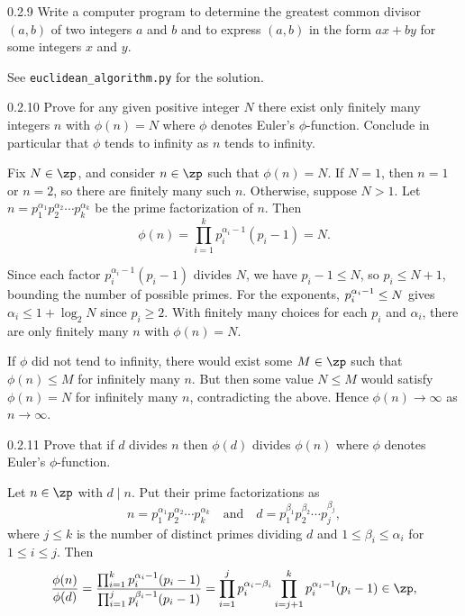 \begin{exercise}{0.2.9}
    Write a computer program to determine the greatest common divisor $(a, b)$ of two integers $a$ and $b$ and to express $(a, b)$ in the form $ax + by$ for some integers $x$ and $y$.
\end{exercise}

\begin{sol}
    See \verb|euclidean_algorithm.py| for the solution.
\end{sol}

\begin{exercise}{0.2.10}
    Prove for any given positive integer $N$ there exist only finitely many integers $n$ with $\phi(n) = N$ where $\phi$ denotes Euler's $\phi$-function.
	Conclude in particular that $\phi$ tends to infinity as $n$ tends to infinity.
\end{exercise}

\begin{sol}
    Fix $N \in \zp$, and consider $n \in \zp$ such that $\phi(n) = N$.
    If $N = 1$, then $n = 1$ or $n = 2$, so there are finitely many such $n$.
    Otherwise, suppose $N > 1$.
	Let $n = p_1^{\alpha_1} p_2^{\alpha_2} \cdots p_k^{\alpha_k}$ be the prime factorization of $n$.
	Then
    \[
    	\phi(n) = \prod_{i=1}^k p_i^{\alpha_i - 1}(p_i - 1) = N.
    \]
    
    Since each factor $p_i^{\alpha_i - 1}(p_i - 1)$ divides $N$, we have $p_i - 1 \leq N$, so $p_i \leq N + 1$, bounding the number of possible primes.
	For the exponents, $\smash{p_i^{\alpha_i - 1}} \leq N$ gives $\alpha_i \leq 1 + \log_2 N$ since $p_i \geq 2$.
	With finitely many choices for each $p_i$ and $\alpha_i$, there are only finitely many $n$ with $\phi(n) = N$.

    If $\phi$ did not tend to infinity, there would exist some $M \in \zp$ such that $\phi(n) \leq M$ for infinitely many $n$.
	But then some value $N \leq M$ would satisfy $\phi(n) = N$ for infinitely many $n$, contradicting the above.
	Hence $\phi(n) \to \infty$ as $n \to \infty$.
\end{sol}

\begin{exercise}{0.2.11}
    Prove that if $d$ divides $n$ then $\phi(d)$ divides $\phi(n)$ where $\phi$ denotes Euler's $\phi$-function.
\end{exercise}

\begin{sol}
    Let $n \in \zp$ with $d \mid n$.
    Put their prime factorizations as
    \[
        n = p_1^{\alpha_1} p_2^{\alpha_2} \cdots p_k^{\alpha_k} \quad \text{and} \quad d = p_1^{\beta_1} p_2^{\beta_2} \cdots p_j^{\beta_j},
    \]
    where $j \leq k$ is the number of distinct primes dividing $d$ and $1 \leq \beta_i \leq \alpha_i$ for $1 \leq i \leq j$.
    Then
    \[
        \frac{\phi(n)}{\phi(d)} = \frac{\prod_{i=1}^k p_i^{\alpha_i - 1}(p_i - 1)}{\prod_{i=1}^j p_i^{\beta_i - 1}(p_i - 1)} = \prod_{i=1}^j p_i^{\alpha_i - \beta_i} \prod_{i=j+1}^k p_i^{\alpha_i - 1}(p_i - 1) \in \zp,
    \]
\end{sol}